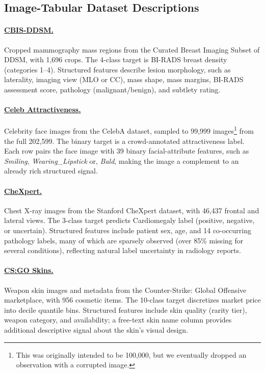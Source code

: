 \subsection{Image-Tabular Dataset Descriptions}

\paragraph{\href{https://www.kaggle.com/datasets/awsaf49/cbis-ddsm-breast-cancer-image-dataset}{CBIS-DDSM.}} Cropped mammography mass regions from the Curated Breast Imaging Subset of DDSM, with 1,696 crops.
The 4-class target is BI-RADS breast density (categories 1--4).
Structured features describe lesion morphology, such as laterality, imaging view (MLO or CC), mass shape, mass margins, BI-RADS assessment score, pathology (malignant/benign), and subtlety rating.

\paragraph{\href{https://www.kaggle.com/datasets/jessicali9530/celeba-dataset}{Celeb Attractiveness.}} Celebrity face images from the CelebA dataset, sampled to 99,999 images\footnote{This was originally intended to be 100,000, but we eventually dropped an observation with a corrupted image.} from the full 202,599. The binary target is a crowd-annotated attractiveness label.
Each row pairs the face image with 39 binary facial-attribute features, such as \textit{Smiling}, \textit{Wearing\_Lipstick} or, \textit{Bald}, making the image a complement to 
an already rich structured signal.

\paragraph{\href{https://www.kaggle.com/datasets/ashery/chexpert}{CheXpert.}} Chest X-ray images from the Stanford CheXpert dataset, with 46,437 frontal and lateral views.
The 3-class target predicts Cardiomegaly label (positive, negative, or uncertain).
Structured features include patient sex, age, and 14 co-occurring pathology labels, many of which are sparsely observed (over 85\% missing for several conditions), reflecting natural label uncertainty in radiology reports.

\paragraph{\href{https://figshare.com/ndownloader/files/38077458}{CS:GO Skins.}} Weapon skin images and metadata from the Counter-Strike: Global Offensive marketplace, with 956 cosmetic items.
The 10-class target discretizes market price into decile quantile bins.
Structured features include skin quality (rarity tier), weapon category, and availability; a free-text skin name column provides additional descriptive signal about the skin's visual design.

